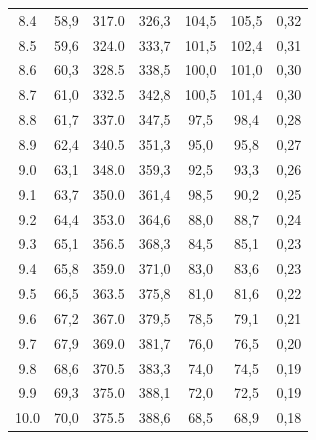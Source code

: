 \documentclass[titlepage = firstcover]{scrartcl}
\begin{document}
\begin{table}[h]
\begin{tabular}{c c c c c c c}
            8.4	                &  58,9              &  317.0          &    326,3       &    104,5        &    105,5       &  0,32 \\
            8.5	                &  59,6              &  324.0          &    333,7       &    101,5        &    102,4       &  0,31 \\
            8.6	                &  60,3              &  328.5          &    338,5       &    100,0        &    101,0       &  0,30 \\
            8.7	                &  61,0              &  332.5          &    342,8       &    100,5        &    101,4       &  0,30 \\
            8.8	                &  61,7              &  337.0          &    347,5       &    97,5         &    98,4        &  0,28 \\
            8.9	                &  62,4              &  340.5          &    351,3       &    95,0         &    95,8        &  0,27 \\
            9.0	                &  63,1              &  348.0          &    359,3       &    92,5         &    93,3        &  0,26 \\
            9.1	                &  63,7              &  350.0          &    361,4       &    98,5         &    90,2        &  0,25 \\
            9.2	                &  64,4              &  353.0          &    364,6       &    88,0         &    88,7        &  0,24 \\
            9.3	                &  65,1              &  356.5          &    368,3       &    84,5         &    85,1        &  0,23 \\
            9.4	                &  65,8              &  359.0          &    371,0       &    83,0         &    83,6        &  0,23 \\
            9.5	                &  66,5              &  363.5          &    375,8       &    81,0         &    81,6        &  0,22 \\
            9.6	                &  67,2              &  367.0          &    379,5       &    78,5         &    79,1        &  0,21 \\
            9.7	                &  67,9              &  369.0          &    381,7       &    76,0         &    76,5        &  0,20 \\
            9.8	                &  68,6              &  370.5          &    383,3       &    74,0         &    74,5        &  0,19 \\
            9.9	                &  69,3              &  375.0          &    388,1       &    72,0         &    72,5        &  0,19 \\
            10.0                &  70,0              &  375.5          &    388,6       &    68,5         &    68,9        &  0,18 \\
            \bottomrule
            
        \end{tabular}
        
    \end{table}
\end{document}
